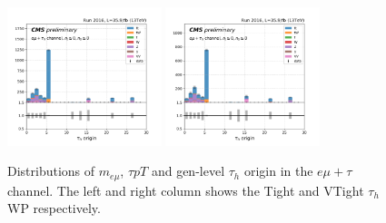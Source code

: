 \begin{figure}
    \includegraphics[width=0.4\textwidth]{appendices/jetToTauhReweighting/figures/emutau_tauGenFlavor_pickles_lltauTight.png}
    \includegraphics[width=0.4\textwidth]{appendices/jetToTauhReweighting/figures/emutau_tauGenFlavor_pickles_lltauVTight.png}
    \caption{Distributions of $m_{e\mu}$, $\tau pT$ and gen-level $\tau_h$ origin in the $e\mu+\tau$ channel. The left and right column shows the Tight and VTight $\tau_h$ WP respectively.}
    \label{fig:appendix:fakeTauId:emutau}
\end{figure}

